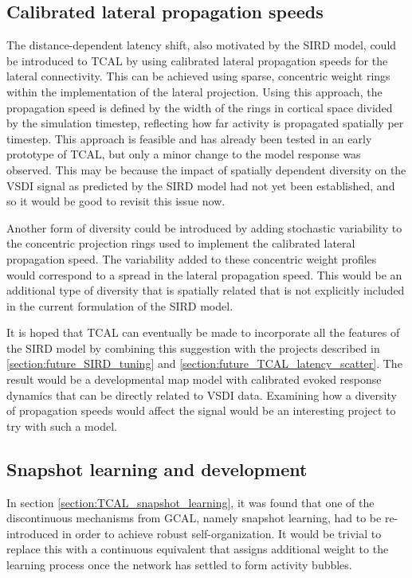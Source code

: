 \documentclass[phd,ianc,twoside]{infthesis}
\begin{document}
\subsection{Calibrated lateral propagation speeds}
\label{section:future_distance_dependent}

The distance-dependent latency shift, also motivated by the SIRD model,
could be introduced to TCAL by using calibrated lateral propagation
speeds for the lateral connectivity. This can be achieved using sparse,
concentric weight rings within the implementation of the lateral
projection. Using this approach, the propagation speed is defined by the
width of the rings in cortical space divided by the simulation timestep,
reflecting how far activity is propagated spatially per timestep. This approach is
feasible and has already been tested in an early prototype of TCAL, but only a
minor change to the model response was observed. This may be because the
impact of spatially dependent diversity on the VSDI signal as
predicted by the SIRD model had not yet been established, and so it
would be good to revisit this issue now.

Another form of diversity could be introduced by adding stochastic
variability to the concentric projection rings used to implement the
calibrated lateral propagation speed. The variability added to these
concentric weight profiles would correspond to a spread in the lateral
propagation speed. This would be an additional type of diversity that is
spatially related that is not explicitly included
in the current formulation of the SIRD model.

It is hoped that TCAL can eventually be made to incorporate all the
features of the SIRD model by combining this suggestion with the
projects described in \ref{section:future_SIRD_tuning} and
\ref{section:future_TCAL_latency_scatter}. The result would be a
developmental map model with calibrated evoked response dynamics that
can be directly related to VSDI data. Examining how a diversity of
propagation speeds would affect the signal would be an interesting project
to try with such a model.

\subsection{Snapshot learning and development}
\label{section:future_TCAL_snapshot_learning}

In section \ref{section:TCAL_snapshot_learning}, it was found that one
of the discontinuous mechanisms from GCAL, namely snapshot learning,
had to be re-introduced in order to achieve robust self-organization. It
would be trivial to replace this with a continuous equivalent that
assigns additional weight to the learning process once the network has
settled to form activity bubbles.
\end{document}
